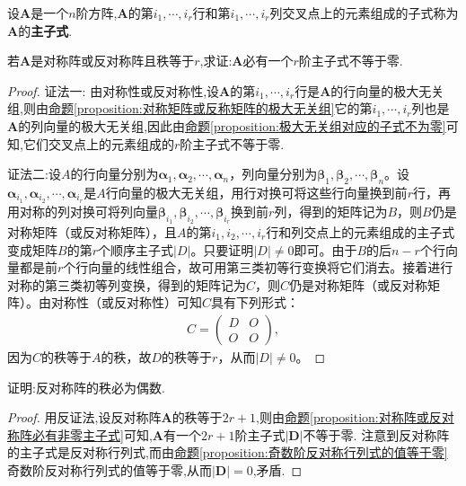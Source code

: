 \documentclass[../../main.tex]{subfiles}
\begin{document}
\begin{definition}[主子式]
设\(\boldsymbol{A}\)是一个\(n\)阶方阵,\(\boldsymbol{A}\)的第\(i_1,\cdots,i_r\)行和第\(i_1,\cdots,i_r\)列交叉点上的元素组成的子式称为\(\boldsymbol{A}\)的\textbf{主子式}. 
\end{definition}

\begin{proposition}\label{proposition:对称阵或反对称阵必有非零主子式}
若\(\boldsymbol{A}\)是对称阵或反对称阵且秩等于\(r\),求证:\(\boldsymbol{A}\)必有一个\(r\)阶主子式不等于零.
\end{proposition}
\begin{proof}
{\color{blue}证法一:}
由对称性或反对称性,设\(\boldsymbol{A}\)的第\(i_1,\cdots,i_r\)行是\(\boldsymbol{A}\)的行向量的极大无关组,则由\hyperref[proposition:对称矩阵或反称矩阵的极大无关组]{命题\ref{proposition:对称矩阵或反称矩阵的极大无关组}}它的第\(i_1,\cdots,i_r\)列也是\(\boldsymbol{A}\)的列向量的极大无关组,因此由\hyperref[proposition:极大无关组对应的子式不为零]{命题\ref{proposition:极大无关组对应的子式不为零}}可知,它们交叉点上的元素组成的\(r\)阶主子式不等于零. 

{\color{blue}证法二:}设\(A\)的行向量分别为\(\boldsymbol{\alpha}_1,\boldsymbol{\alpha}_2,\cdots,\boldsymbol{\alpha}_n\)，列向量分别为\(\boldsymbol{\beta}_1,\boldsymbol{\beta}_2,\cdots,\boldsymbol{\beta}_n\)。设\(\boldsymbol{\alpha}_{i_1},\boldsymbol{\alpha}_{i_2},\cdots,\boldsymbol{\alpha}_{i_r}\)是\(A\)行向量的极大无关组，用行对换可将这些行向量换到前\(r\)行，再用对称的列对换可将列向量\(\boldsymbol{\beta}_{i_1},\boldsymbol{\beta}_{i_2},\cdots,\boldsymbol{\beta}_{i_r}\)换到前\(r\)列，得到的矩阵记为\(B\)，则\(B\)仍是对称矩阵（或反对称矩阵），且\(A\)的第\(i_1,i_2,\cdots,i_r\)行和列交点上的元素组成的主子式变成矩阵\(B\)的第\(r\)个顺序主子式\(\vert D\vert\)。只要证明\(\vert D\vert\neq 0\)即可。由于\(B\)的后\(n - r\)个行向量都是前\(r\)个行向量的线性组合，故可用第三类初等行变换将它们消去。接着进行对称的第三类初等列变换，得到的矩阵记为\(C\)，则\(C\)仍是对称矩阵（或反对称矩阵）。由对称性（或反对称性）可知\(C\)具有下列形式：
\begin{align*}
C = \begin{pmatrix}
D & O \\
O & O
\end{pmatrix},
\end{align*}
因为\(C\)的秩等于\(A\)的秩，故\(D\)的秩等于\(r\)，从而\(\vert D\vert\neq 0\)。 
\end{proof}

\begin{proposition}[反对称阵的秩必为偶数]\label{proposition:反对称阵的秩必为偶数}
证明:反对称阵的秩必为偶数.
\end{proposition}
\begin{proof}
用反证法,设反对称阵\(\boldsymbol{A}\)的秩等于\(2r + 1\),则由\hyperref[proposition:对称阵或反对称阵必有非零主子式]{命题\ref{proposition:对称阵或反对称阵必有非零主子式}}可知,\(\boldsymbol{A}\)有一个\(2r + 1\)阶主子式\(|\boldsymbol{D}|\)不等于零. 注意到反对称阵的主子式是反对称行列式,而由\hyperref[proposition:奇数阶反对称行列式的值等于零]{命题\ref{proposition:奇数阶反对称行列式的值等于零}}奇数阶反对称行列式的值等于零,从而\(|\boldsymbol{D}| = 0\),矛盾.
\end{proof}
\end{document}
